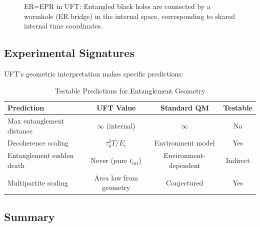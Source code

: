 \begin{figure}[htbp]
\centering
{}
\caption{ER=EPR in UFT: Entangled black holes are connected by a wormhole (ER bridge) in the internal space, corresponding to shared internal time coordinates.}
\label{fig:er_epr}
\end{figure}

\subsection{Experimental Signatures}

UFT's geometric interpretation makes specific predictions:

\begin{table}[htbp]
\centering
\caption{Testable Predictions for Entanglement Geometry}
\begin{tabular}{@{}lccc@{}}
\toprule
\textbf{Prediction} & \textbf{UFT Value} & \textbf{Standard QM} & \textbf{Testable} \\
\midrule
Max entanglement distance & $\infty$ (internal) & $\infty$ & No \\
Decoherence scaling & $\tau_0^2 T/E_c$ & Environment model & Yes \\
Entanglement sudden death & Never (pure $t_{int}$) & Environment-dependent & Indirect \\
Multipartite scaling & Area law from geometry & Conjectured & Yes \\
\bottomrule
\end{tabular}
\label{tab:entanglement_predictions}
\end{table}

\subsection{Summary}

